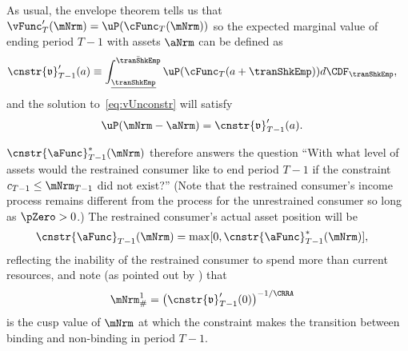 \documentclass[\econtexRoot/BufferStockTheory]{subfiles}
\begin{document}
As usual, the envelope theorem tells us that $\vFunc_{T}^{\prime}(\mNrm)=\uP(\cFunc_{T}(\mNrm))$ so the expected marginal value of ending period $T-1$ with assets $\aNrm$ can be defined as
\begin{equation}\begin{gathered}\begin{aligned}
      \cnstr{\mathfrak{v}}_{T-1}^{\prime}(a)  & \equiv  \int_{\underline{\tranShkEmp}}^{\bar{\tranShkEmp}} \uP(\cFunc_{T}(a+\tranShkEmp)) d\CDF_{\tranShkEmp}, \notag
    \end{aligned}\end{gathered}\end{equation}
and the solution to~\eqref{eq:vUnconstr} will satisfy
\begin{equation}\begin{gathered}\begin{aligned}
      \uP(\mNrm-\aNrm)  & =  \cnstr{\mathfrak{v}}_{T-1}^{\prime}(a) \label{eq:uPConstr}.
    \end{aligned}\end{gathered}\end{equation}

$\cnstr{\aFunc}_{T-1}^{*}(\mNrm)$ therefore answers the question ``With what level of assets would the restrained consumer like to end period $T-1$ if the constraint $c_{T-1} \leq \mNrm_{T-1}$ did not exist?''  (Note that the restrained consumer's income process remains different from the process for the unrestrained consumer so long as $\pZero>0$.)  The restrained consumer's actual asset position will be
\begin{equation}\begin{gathered}\begin{aligned}
      \cnstr{\aFunc}_{T-1}(\mNrm)  & = \max[0,\cnstr{\aFunc}^{*}_{T-1}(\mNrm)], \notag
    \end{aligned}\end{gathered}\end{equation}
reflecting the inability of the restrained consumer to spend more than current resources, and note (as pointed out by \cite{deatonLiqConstr}) that
\begin{equation}\begin{gathered}\begin{aligned}
      \mNrm^{1}_{\#}  & = {\left( \cnstr{\mathfrak{v}}_{T-1}^{\prime}(0)\right)}^{-1/\CRRA} \notag
    \end{aligned}\end{gathered}\end{equation}
is the cusp value of $\mNrm$ at which the constraint makes the
transition between binding and non-binding in period $T-1$.
\end{document}
